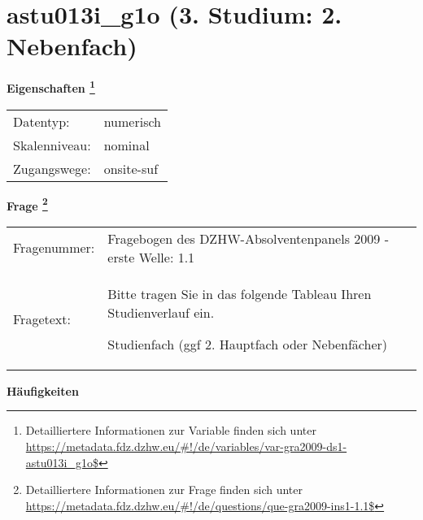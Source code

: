 
    \setcounter{footnote}{0}

    \vspace*{-1.8cm}
	\section{astu013i\_g1o (3. Studium: 2. Nebenfach)}
	\label{section:astu013i_g1o}



    \vspace*{0.5cm}
    \noindent\textbf{Eigenschaften
	\footnote{Detailliertere Informationen zur Variable finden sich unter
		\url{https://metadata.fdz.dzhw.eu/\#!/de/variables/var-gra2009-ds1-astu013i_g1o$}}}\\
	\begin{tabularx}{\hsize}{@{}lX}
	Datentyp: & numerisch \\
	Skalenniveau: & nominal \\
	Zugangswege: &
	  onsite-suf
 \\
    \end{tabularx}



				\vspace*{0.5cm}
                \noindent\textbf{Frage
	                \footnote{Detailliertere Informationen zur Frage finden sich unter
		              \url{https://metadata.fdz.dzhw.eu/\#!/de/questions/que-gra2009-ins1-1.1$}}}\\
				\begin{tabularx}{\hsize}{@{}lX}
					Fragenummer: &
					  Fragebogen des DZHW-Absolventenpanels 2009 - erste Welle:
					  1.1
 \\
					Fragetext: & Bitte tragen Sie in das folgende Tableau Ihren Studienverlauf ein.\par  Studienfach (ggf 2. Hauptfach oder Nebenfächer) \\
				\end{tabularx}





        		\vspace*{0.5cm}
                \noindent\textbf{Häufigkeiten}

